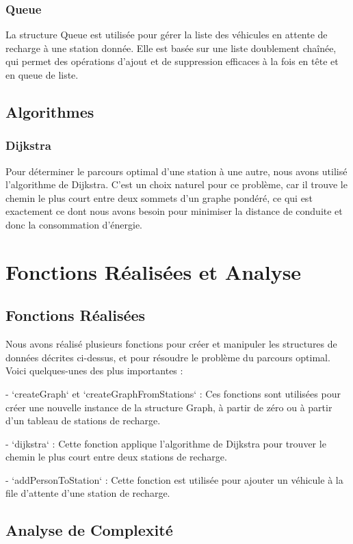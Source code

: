 \documentclass[french,a4paper]{article}
\begin{document}
\subsubsection{Queue}
La structure Queue est utilisée pour gérer la liste des véhicules en attente de recharge à une station donnée. Elle est basée sur une liste doublement chaînée, qui permet des opérations d'ajout et de suppression efficaces à la fois en tête et en queue de liste.

\subsection{Algorithmes}
\subsubsection{Dijkstra}

Pour déterminer le parcours optimal d'une station à une autre, nous avons utilisé l'algorithme de Dijkstra. C'est un choix naturel pour ce problème, car il trouve le chemin le plus court entre deux sommets d'un graphe pondéré, ce qui est exactement ce dont nous avons besoin pour minimiser la distance de conduite et donc la consommation d'énergie.

\section{Fonctions Réalisées et Analyse}
\subsection{Fonctions Réalisées}
Nous avons réalisé plusieurs fonctions pour créer et manipuler les structures de données décrites ci-dessus, et pour résoudre le problème du parcours optimal. Voici quelques-unes des plus importantes :

- `createGraph` et `createGraphFromStations` : Ces fonctions sont utilisées pour créer une nouvelle instance de la structure Graph, à partir de zéro ou à partir d'un tableau de stations de recharge.

- `dijkstra` : Cette fonction applique l'algorithme de Dijkstra pour trouver le chemin le plus court entre deux stations de recharge.

- `addPersonToStation` : Cette fonction est utilisée pour ajouter un véhicule à la file d'attente d'une station de recharge.

\subsection{Analyse de Complexité}
\end{document}
